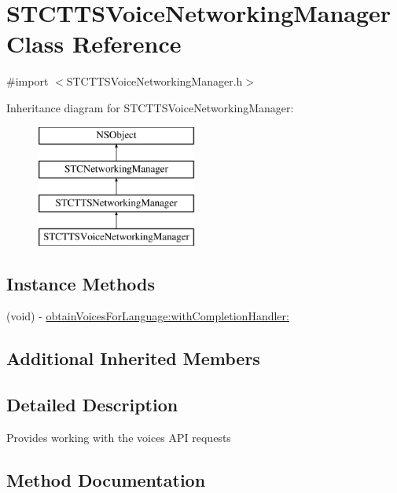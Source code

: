 \hypertarget{interface_s_t_c_t_t_s_voice_networking_manager}{}\section{S\+T\+C\+T\+T\+S\+Voice\+Networking\+Manager Class Reference}
\label{interface_s_t_c_t_t_s_voice_networking_manager}


{\ttfamily \#import $<$S\+T\+C\+T\+T\+S\+Voice\+Networking\+Manager.\+h$>$}

Inheritance diagram for S\+T\+C\+T\+T\+S\+Voice\+Networking\+Manager\+:\begin{figure}[H]
\begin{center}
\leavevmode
\includegraphics[height=4.000000cm]{interface_s_t_c_t_t_s_voice_networking_manager}
\end{center}
\end{figure}
\subsection*{Instance Methods}
\begin{DoxyCompactItemize}
\item 
(void) -\/ \hyperlink{interface_s_t_c_t_t_s_voice_networking_manager_a2c6d6b0d3eddf3835531e209994af44c}{obtain\+Voices\+For\+Language\+:with\+Completion\+Handler\+:}
\end{DoxyCompactItemize}
\subsection*{Additional Inherited Members}


\subsection{Detailed Description}
Provides working with the voices A\+PI requests 

\subsection{Method Documentation}
\hypertarget{interface_s_t_c_t_t_s_voice_networking_manager_a2c6d6b0d3eddf3835531e209994af44c}{}\label{interface_s_t_c_t_t_s_voice_networking_manager_a2c6d6b0d3eddf3835531e209994af44c} 
